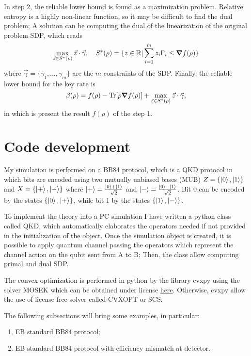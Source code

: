 \documentclass{article}
\begin{document}
    In step 2, the reliable lower bound is found as a maximization problem.
    Relative entropy is a highly non-linear function, so it may be difficult to find the dual problem;
    A solution can be computing the dual of the linearization of the original problem SDP, which reads
    \[\max_{\vec{z}\in S^*(\rho)}\vec{z}\cdot\vec{\gamma}, \quad S^*(\rho)=\{z\in \mathbb{R}|\sum_{i=1}^mz_i\Gamma_i\leq \grad f(\rho) \} \]
    where \(\vec{\gamma}=\{\gamma_1,\ldots,\gamma_m\}\) are the \(m\)-constraints of the SDP.
    Finally, the reliable lower bound for the key rate is 
    \[\beta(\rho)=f(\rho) - \Tr[\rho \grad f(\rho)] + \max_{\vec{z}\in S^*(\rho)}\vec{z}\cdot\vec{\gamma},\]
    in which is present the result \(f(\rho)\) of the step 1.

\section{Code development}
    My simulation is performed on a BB84 protocol, which is a QKD protocol in which bits are encoded using two mutually unbiased bases (MUB) \(Z=\{\ket{0}, \ket{1}\}\) and \(X=\{\ket{+},\ket{-}\}\) where \(\ket{+}=\frac{\ket{0}+\ket{1}}{\sqrt{2}}\) and \(\ket{-}=\frac{\ket{0}-\ket{1}}{\sqrt{2}}\).
    Bit \( 0 \) can be encoded by the states \( \{ \ket{0}, \ket{+} \} \), while bit \(1\) by the states \( \{ \ket{1}, \ket{-} \} \).

    To implement the theory into a PC simulation I have written a python class called \textrm{QKD}, which automatically elaborates the operators needed if not provided in the initialization of the object.
    Once the simulation object is created, it is possible to apply quantum channel passing the operators which represent the channel action on the qubit sent from A to B;
    Then, the class allow computing primal and dual SDP.

    The convex optimization is performed in python by the library \textrm{cvxpy} using the solver \textrm{MOSEK} which can be obtained under license \href{https://www.mosek.com/products/academic-licenses/}{here}.
    Otherwise, \textrm{cvxpy} allow the use of license-free solver called \textrm{CVXOPT} or \textrm{SCS}.

    The following subsections will bring some examples, in particular:
    \begin{enumerate}
        \item EB standard BB84 protocol;
        \item EB standard BB84 protocol with efficiency mismatch at detector.
    \end{enumerate}
\end{document}
